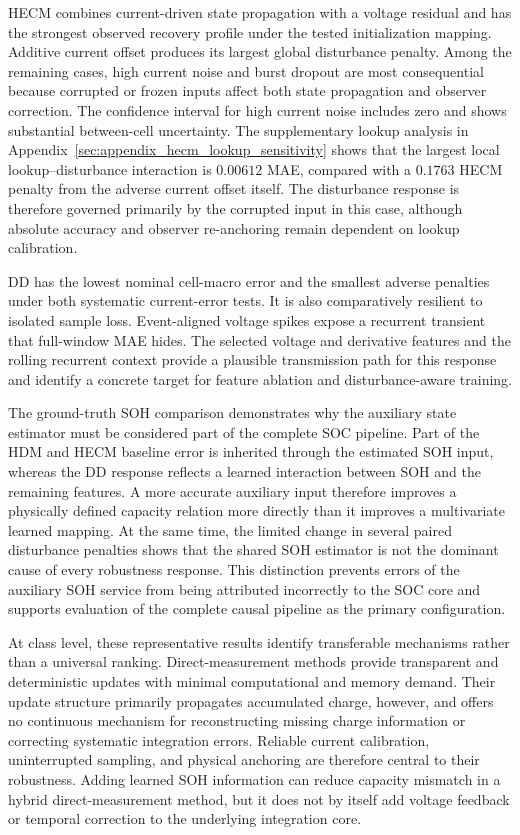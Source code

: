 \documentclass[review,nopreprintline]{elsarticle}
\begin{document}
HECM combines current-driven state propagation with a voltage residual and has the strongest observed recovery profile under the tested initialization mapping. Additive current offset produces its largest global disturbance penalty. Among the remaining cases, high current noise and burst dropout are most consequential because corrupted or frozen inputs affect both state propagation and observer correction. The confidence interval for high current noise includes zero and shows substantial between-cell uncertainty. The supplementary lookup analysis in Appendix~\ref{sec:appendix_hecm_lookup_sensitivity} shows that the largest local lookup--disturbance interaction is $0.00612$ MAE, compared with a $0.1763$ HECM penalty from the adverse current offset itself. The disturbance response is therefore governed primarily by the corrupted input in this case, although absolute accuracy and observer re-anchoring remain dependent on lookup calibration.

DD has the lowest nominal cell-macro error and the smallest adverse penalties under both systematic current-error tests. It is also comparatively resilient to isolated sample loss. Event-aligned voltage spikes expose a recurrent transient that full-window MAE hides. The selected voltage and derivative features and the rolling recurrent context provide a plausible transmission path for this response and identify a concrete target for feature ablation and disturbance-aware training.

The ground-truth SOH comparison demonstrates why the auxiliary state estimator must be considered part of the complete SOC pipeline. Part of the HDM and HECM baseline error is inherited through the estimated SOH input, whereas the DD response reflects a learned interaction between SOH and the remaining features. A more accurate auxiliary input therefore improves a physically defined capacity relation more directly than it improves a multivariate learned mapping. At the same time, the limited change in several paired disturbance penalties shows that the shared SOH estimator is not the dominant cause of every robustness response. This distinction prevents errors of the auxiliary SOH service from being attributed incorrectly to the SOC core and supports evaluation of the complete causal pipeline as the primary configuration.

At class level, these representative results identify transferable mechanisms rather than a universal ranking. Direct-measurement methods provide transparent and deterministic updates with minimal computational and memory demand. Their update structure primarily propagates accumulated charge, however, and offers no continuous mechanism for reconstructing missing charge information or correcting systematic integration errors. Reliable current calibration, uninterrupted sampling, and physical anchoring are therefore central to their robustness. Adding learned SOH information can reduce capacity mismatch in a hybrid direct-measurement method, but it does not by itself add voltage feedback or temporal correction to the underlying integration core.
\end{document}
